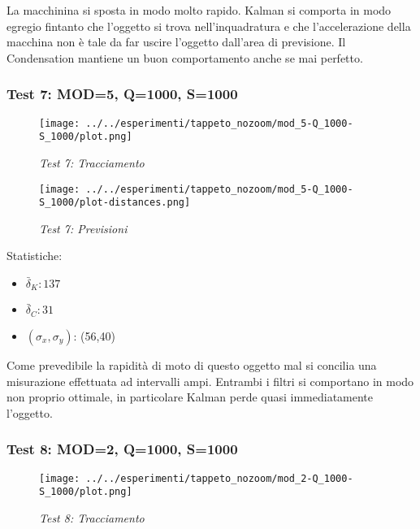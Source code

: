 La macchinina si sposta in modo molto rapido. Kalman si comporta in modo egregio fintanto che l'oggetto si trova nell'inquadratura e che l'accelerazione della macchina non è tale da far uscire l'oggetto dall'area di previsione. Il Condensation mantiene un buon comportamento anche se mai perfetto.

\newpage
\subsubsection{Test 7: MOD=5, Q=1000, S=1000}

\begin{figure}[hb]
\centering
\texttt{[image: ../../esperimenti/tappeto\_nozoom/mod\_5-Q\_1000-S\_1000/plot.png]}
\caption{\textit{Test 7: Tracciamento}}
\end{figure}

\begin{figure}[hb]
\centering
\texttt{[image: ../../esperimenti/tappeto\_nozoom/mod\_5-Q\_1000-S\_1000/plot-distances.png]}
\caption{\textit{Test 7: Previsioni}}
\end{figure}

Statistiche:
\begin{itemize}
\item \begin{math} \bar \delta_K: 137 \end{math}
\item \begin{math} \bar \delta_C: 31\end{math}
\item \begin{math}(\sigma_x,\sigma_y)\end{math}: (56,40)
\end{itemize} 

Come prevedibile la rapidità di moto di questo oggetto mal si concilia una misurazione effettuata ad intervalli ampi. Entrambi i filtri si comportano in modo non proprio ottimale, in particolare Kalman perde quasi immediatamente l'oggetto. 

\newpage
\subsubsection{Test 8: MOD=2, Q=1000, S=1000}

\begin{figure}[hb]
\centering
\texttt{[image: ../../esperimenti/tappeto\_nozoom/mod\_2-Q\_1000-S\_1000/plot.png]}
\caption{\textit{Test 8: Tracciamento}}
\end{figure}

